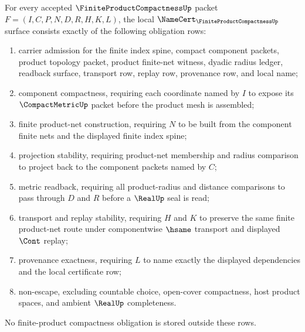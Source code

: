 \begin{theorem}
\label{thm:finite-product-compactness-namecert-obligations}
For every accepted $\FiniteProductCompactnessUp$ packet $F=(I,C,P,N,D,R,H,K,L)$, the local $\NameCert_{\FiniteProductCompactnessUp}$ surface consists exactly of the following obligation rows:
\begin{enumerate}
\item carrier admission for the finite index spine, compact component packets, product topology packet, product finite-net witness, dyadic radius ledger, readback surface, transport row, replay row, provenance row, and local name;
\item component compactness, requiring each coordinate named by $I$ to expose its $\CompactMetricUp$ packet before the product mesh is assembled;
\item finite product-net construction, requiring $N$ to be built from the component finite nets and the displayed finite index spine;
\item projection stability, requiring product-net membership and radius comparison to project back to the component packets named by $C$;
\item metric readback, requiring all product-radius and distance comparisons to pass through $D$ and $R$ before a $\RealUp$ seal is read;
\item transport and replay stability, requiring $H$ and $K$ to preserve the same finite product-net route under componentwise $\hsame$ transport and displayed $\Cont$ replay;
\item provenance exactness, requiring $L$ to name exactly the displayed dependencies and the local certificate row;
\item non-escape, excluding countable choice, open-cover compactness, host product spaces, and ambient $\RealUp$ completeness.
\end{enumerate}
No finite-product compactness obligation is stored outside these rows.
\end{theorem}
